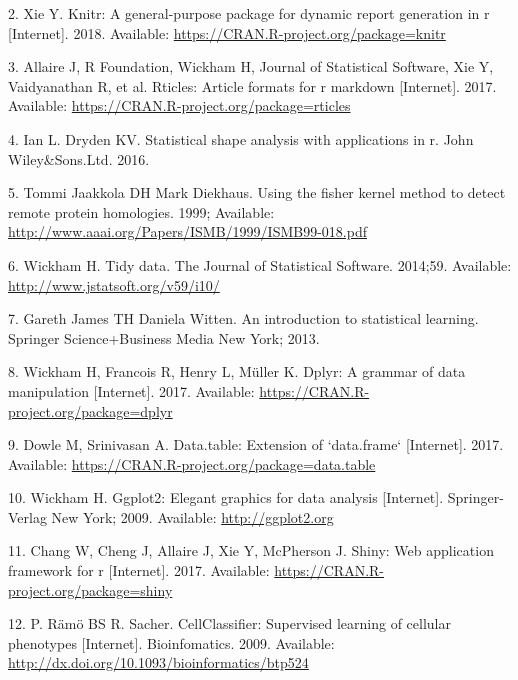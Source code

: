 \documentclass[10pt,letterpaper]{article}
\begin{document}
\hypertarget{ref-pkgknitr}{}
2. Xie Y. Knitr: A general-purpose package for dynamic report generation
in r {[}Internet{]}. 2018. Available:
\url{https://CRAN.R-project.org/package=knitr}

\hypertarget{ref-pkgrticles}{}
3. Allaire J, R Foundation, Wickham H, Journal of Statistical Software,
Xie Y, Vaidyanathan R, et al. Rticles: Article formats for r markdown
{[}Internet{]}. 2017. Available:
\url{https://CRAN.R-project.org/package=rticles}

\hypertarget{ref-Dryden2016}{}
4. Ian L. Dryden KV. Statistical shape analysis with applications in r.
John Wiley\&Sons.Ltd. 2016.

\hypertarget{ref-Jaakkola1999}{}
5. Tommi Jaakkola DH Mark Diekhaus. Using the fisher kernel method to
detect remote protein homologies. 1999; Available:
\url{http://www.aaai.org/Papers/ISMB/1999/ISMB99-018.pdf}

\hypertarget{ref-pkgtidyr}{}
6. Wickham H. Tidy data. The Journal of Statistical Software. 2014;59.
Available: \url{http://www.jstatsoft.org/v59/i10/}

\hypertarget{ref-James2013}{}
7. Gareth James TH Daniela Witten. An introduction to statistical
learning. Springer Science+Business Media New York; 2013.

\hypertarget{ref-pkgdplyr}{}
8. Wickham H, Francois R, Henry L, Müller K. Dplyr: A grammar of data
manipulation {[}Internet{]}. 2017. Available:
\url{https://CRAN.R-project.org/package=dplyr}

\hypertarget{ref-pkgdatatable}{}
9. Dowle M, Srinivasan A. Data.table: Extension of `data.frame`
{[}Internet{]}. 2017. Available:
\url{https://CRAN.R-project.org/package=data.table}

\hypertarget{ref-pkgggplot2}{}
10. Wickham H. Ggplot2: Elegant graphics for data analysis
{[}Internet{]}. Springer-Verlag New York; 2009. Available:
\url{http://ggplot2.org}

\hypertarget{ref-pkgshiny}{}
11. Chang W, Cheng J, Allaire J, Xie Y, McPherson J. Shiny: Web
application framework for r {[}Internet{]}. 2017. Available:
\url{https://CRAN.R-project.org/package=shiny}

\hypertarget{ref-Pelkmanslab}{}
12. P. Rämö BS R. Sacher. CellClassifier: Supervised learning of
cellular phenotypes {[}Internet{]}. Bioinfomatics. 2009. Available:
\url{http://dx.doi.org/10.1093/bioinformatics/btp524}

\nolinenumbers
\end{document}

